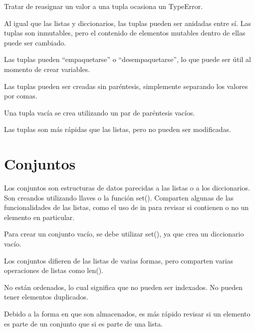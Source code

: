 \documentclass{report}
\newcommand{\doble}[1]{``#1''}
\begin{document}
{Tratar de reasignar un valor a una tupla ocasiona un TypeError.


Al igual que las listas y diccionarios, las tuplas pueden ser anidadas entre sí.
Las tuplas son inmutables, pero el contenido de elementos mutables dentro de ellas puede ser cambiado.


Las tuplas pueden \doble{empaquetarse} o \doble{desempaquetarse}, lo que puede ser útil al momento de crear variables.


Las tuplas pueden ser creadas sin paréntesis, simplemente separando los valores por comas.


Una tupla vacía se crea utilizando un par de paréntesis vacíos.


Las tuplas son más rápidas que las listas, pero no pueden ser modificadas.


\section{Conjuntos}

Los conjuntos son estructuras de datos parecidas a las listas o a los diccionarios. Son creandos utilizando llaves o la función set(). Comparten algunas de las funcionalidades de las listas, como el uso de in para revisar si contienen o no un elemento en particular.


Para crear un conjunto vacío, se debe utilizar set(), ya que {} crea un diccionario vacío.


Los conjuntos difieren de las listas de varias formas, pero comparten varias operaciones de listas como len().

No están ordenados, lo cual significa que no pueden ser indexados. No pueden tener elementos duplicados.

Debido a la forma en que son almacenados, es más rápido revisar si un elemento es parte de un conjunto que si es parte de una lista.

}
\end{document}
